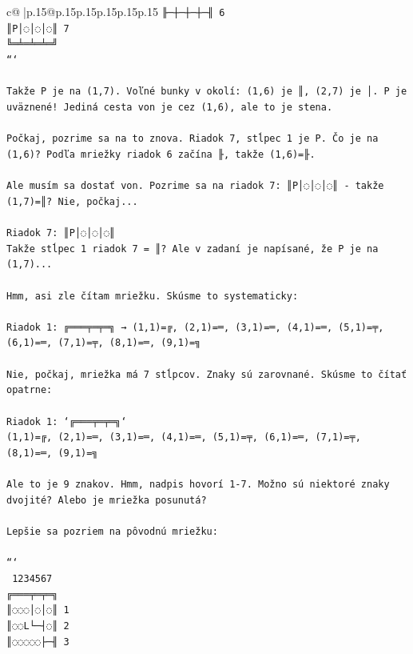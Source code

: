 \documentclass{article}
\begin{document}
{\begin{supertabular}{c@{$\;$}|p{.15\linewidth}@{}p{.15\linewidth}p{.15\linewidth}p{.15\linewidth}p{.15\linewidth}p{.15\linewidth}}
{{{\texttt{╟─┼─┼─┼─╢ 6} \\
\texttt{║P│◌│◌│◌║ 7} \\
\texttt{╚═╧═╧═╧═╝} \\
\texttt{```} \\
\\ 
\texttt{Takže P je na (1,7). Voľné bunky v okolí: (1,6) je ║, (2,7) je │. P je uväznené! Jediná cesta von je cez (1,6), ale to je stena.} \\
\\ 
\texttt{Počkaj, pozrime sa na to znova. Riadok 7, stĺpec 1 je P. Čo je na (1,6)? Podľa mriežky riadok 6 začína ╟, takže (1,6)=╟. } \\
\\ 
\texttt{Ale musím sa dostať von. Pozrime sa na riadok 7: ║P│◌│◌│◌║ {-} takže (1,7)=║? Nie, počkaj... } \\
\\ 
\texttt{Riadok 7: ║P│◌│◌│◌║} \\
\texttt{Takže stĺpec 1 riadok 7 = ║? Ale v zadaní je napísané, že P je na (1,7)... } \\
\\ 
\texttt{Hmm, asi zle čítam mriežku. Skúsme to systematicky:} \\
\\ 
\texttt{Riadok 1: ╔═══╤═╤═╗ → (1,1)=╔, (2,1)=═, (3,1)=═, (4,1)=═, (5,1)=╤, (6,1)=═, (7,1)=╤, (8,1)=═, (9,1)=╗} \\
\\ 
\texttt{Nie, počkaj, mriežka má 7 stĺpcov. Znaky sú zarovnané. Skúsme to čítať opatrne:} \\
\\ 
\texttt{Riadok 1: `╔═══╤═╤═╗`} \\
\texttt{(1,1)=╔, (2,1)=═, (3,1)=═, (4,1)=═, (5,1)=╤, (6,1)=═, (7,1)=╤, (8,1)=═, (9,1)=╗} \\
\\ 
\texttt{Ale to je 9 znakov. Hmm, nadpis hovorí 1{-}7. Možno sú niektoré znaky dvojité? Alebo je mriežka posunutá?} \\
\\ 
\texttt{Lepšie sa pozriem na pôvodnú mriežku:} \\
\\ 
\texttt{```} \\
\texttt{ 1234567} \\
\texttt{╔═══╤═╤═╗} \\
\texttt{║◌◌◌│◌│◌║ 1} \\
\texttt{║◌◌L└─┤◌║ 2} \\
\texttt{║◌◌◌◌◌├─╢ 3} \\
}}}
\end{supertabular}}
\end{document}
